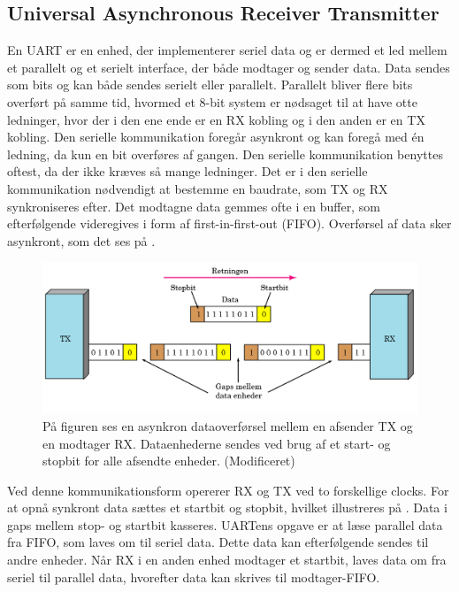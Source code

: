 \subsection{Universal Asynchronous Receiver Transmitter}
En UART er en enhed, der implementerer seriel data og er dermed et led mellem et parallelt og et serielt interface, der både modtager og sender data. Data sendes som bits og kan både sendes serielt eller parallelt. \citep{Jimb02016a,Chun-zhiYin-shuiLun-yao2011} Parallelt bliver flere bits overført på samme tid, hvormed et 8-bit system er nødsaget til at have otte ledninger, hvor der i den ene ende er en RX kobling og i den anden er en TX kobling. \citep{Jimb02016a} Den serielle kommunikation foregår asynkront og kan foregå med én ledning, da kun en bit overføres af gangen. Den serielle kommunikation benyttes oftest, da der ikke kræves så mange ledninger. Det er i den serielle kommunikation nødvendigt at bestemme en baudrate, som TX og RX synkroniseres efter. Det modtagne data gemmes ofte i en buffer, som efterfølgende videregives i form af first-in-first-out (FIFO). \citep{Jimb02016a}\newline 
Overførsel af data sker asynkront, som det ses på .
\begin{figure}[H]
	\centering
	\includegraphics[scale=0.5]{figures/bProblemloesning/asynkron.png}
	\caption{På figuren ses en asynkron dataoverførsel mellem en afsender TX og en modtager RX. Dataenhederne sendes ved brug af et start- og stopbit for alle afsendte enheder. \citep{Jimb02016} (Modificeret)}
	\label{fig:asynkron}
\end{figure}\vspace{-0.25cm}
Ved denne kommunikationsform opererer RX og TX ved to forskellige clocks. For at opnå synkront data sættes et startbit og stopbit, hvilket illustreres på . Data i gaps mellem stop- og startbit kasseres. UARTens opgave er at læse parallel data fra FIFO, som laves om til seriel data. Dette data kan efterfølgende sendes til andre enheder. Når RX i en anden enhed modtager et startbit, laves data om fra seriel til parallel data, hvorefter data kan skrives til modtager-FIFO. \citep{Jimb02016a,Chun-zhiYin-shuiLun-yao2011}

